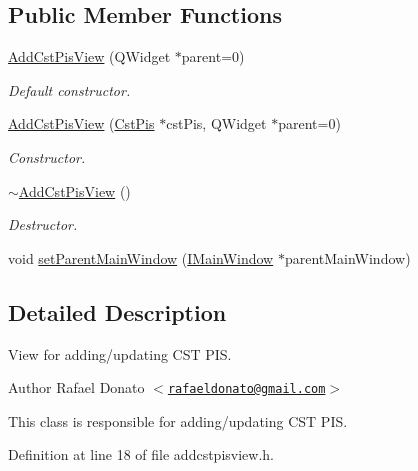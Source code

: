 \subsection*{\-Public \-Member \-Functions}
\begin{DoxyCompactItemize}
\item 
\hyperlink{class_add_cst_pis_view_a3a3342cbab15f15d0ae62dca1b75820b}{\-Add\-Cst\-Pis\-View} (\-Q\-Widget $\ast$parent=0)
\begin{DoxyCompactList}\small\item\em \-Default constructor. \end{DoxyCompactList}\item 
\hyperlink{class_add_cst_pis_view_a39edc652a7522b2ed80dd1904e524b04}{\-Add\-Cst\-Pis\-View} (\hyperlink{class_cst_pis}{\-Cst\-Pis} $\ast$cst\-Pis, \-Q\-Widget $\ast$parent=0)
\begin{DoxyCompactList}\small\item\em \-Constructor. \end{DoxyCompactList}\item 
\hyperlink{class_add_cst_pis_view_a186d7d029823157e59cd0c190e393184}{$\sim$\-Add\-Cst\-Pis\-View} ()
\begin{DoxyCompactList}\small\item\em \-Destructor. \end{DoxyCompactList}\item 
void \hyperlink{class_add_cst_pis_view_aa37e167722503dad6aeba82a5b682b94}{set\-Parent\-Main\-Window} (\hyperlink{class_i_main_window}{\-I\-Main\-Window} $\ast$parent\-Main\-Window)
\end{DoxyCompactItemize}


\subsection{\-Detailed \-Description}
\-View for adding/updating \-C\-S\-T \-P\-I\-S. 

\begin{DoxyAuthor}{\-Author}
\-Rafael \-Donato $<$\href{mailto:rafaeldonato@gmail.com}{\tt rafaeldonato@gmail.\-com}$>$
\end{DoxyAuthor}
\-This class is responsible for adding/updating \-C\-S\-T \-P\-I\-S. 

\-Definition at line 18 of file addcstpisview.\-h.



